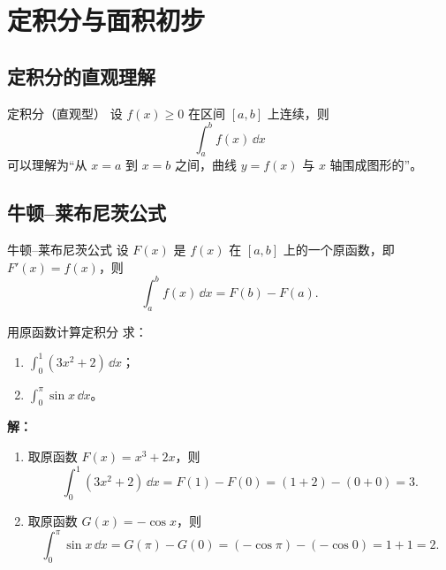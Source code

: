 \documentclass[a4paper,11pt]{ctexart}
\begin{document}
\section{定积分与面积初步}

\subsection{定积分的直观理解}

\begin{definitionbox}{定积分（直观型）}
设 $f(x)\ge 0$ 在区间 $[a,b]$ 上连续，则
\[
  \int_a^b f(x)\,\dd x
\]
可以理解为“从 $x=a$ 到 $x=b$ 之间，曲线 $y=f(x)$ 与 $x$ 轴围成图形的”。
\end{definitionbox}

\begin{center}
\end{center}

\subsection{牛顿--莱布尼茨公式}

\begin{theorembox}{牛顿--莱布尼茨公式}
设 $F(x)$ 是 $f(x)$ 在 $[a,b]$ 上的一个原函数，即 $F'(x)=f(x)$，则
\[
  \int_a^b f(x)\,\dd x = F(b)-F(a).
\]
\end{theorembox}

\begin{examplebox}{用原函数计算定积分}
求：
\begin{enumerate}
  \item $\displaystyle\int_0^1 (3x^2+2)\,\dd x$；
  \item $\displaystyle\int_0^{\pi} \sin x\,\dd x$。
\end{enumerate}
\textbf{解：}
\begin{enumerate}
  \item 取原函数 $F(x)=x^3+2x$，则
  \[
    \int_0^1 (3x^2+2)\,\dd x
    =F(1)-F(0)=(1+2)-(0+0)=3.
  \]
  \item 取原函数 $G(x)=-\cos x$，则
  \[
    \int_0^{\pi} \sin x\,\dd x
    =G(\pi)-G(0)=(-\cos\pi)-(-\cos 0)=1+1=2.
  \]
\end{enumerate}
\end{examplebox}
\end{document}
